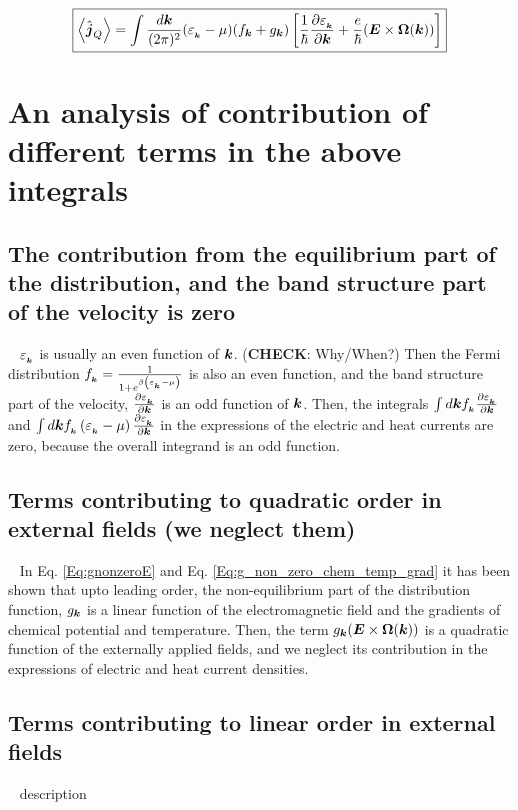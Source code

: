 \documentclass{report}
\renewcommand\vec[1]{\ensuremath\boldsymbol{#1}} %
\begin{document}
\begin{equation} \label{Eq:heat-current-simplified}
	\boxed{\expval{\hat{\vec{j}}_Q} = \int \frac{d\vec{k}}{(2\pi)^2} (\varepsilon_{_{\vec{k}}} - \mu) ({f}_{\vec{k}} + {g}_{\vec{k}}) \left[\frac{1}{\hbar} \frac{\partial \varepsilon_{_{\vec{k}}}}{\partial \vec{k}} + \frac{e}{\hbar} (\vec{E}\times\vec{\Omega}(\vec{k}))\right]}
\end{equation}
\section{An analysis of contribution of different terms in the above integrals}
\subsection{The contribution from the equilibrium part of the distribution, and the band structure part of the velocity is \textbf{zero}}~\label{sec:zeroCont}
$\varepsilon_{_{\vec{k}}}$ is usually an even function of $\vec{k}$. (\textbf{CHECK}: Why/When?) Then the Fermi distribution $f_{_{\vec{k}}} = \frac{1}{1+ e^{\beta\left(\varepsilon_{_{\vec{k}}} - \mu\right)}}$ is also an even function, and the band structure part of the velocity, $\frac{\partial \varepsilon_{_{\vec{k}}}}{\partial \vec{k}}$ is an odd function of $\vec{k}$. Then, the integrals $\int d\vec{k} f_{_{\vec{k}}} \frac{\partial \varepsilon_{_{\vec{k}}}}{\partial \vec{k}}$ and $\int d\vec{k} f_{_{\vec{k}}} \left(\varepsilon_{_{\vec{k}}} - \mu\right) \frac{\partial \varepsilon_{_{\vec{k}}}}{\partial \vec{k}}$ in the expressions of the electric and heat currents are zero, because the overall integrand is an odd function.
\subsection{Terms contributing to quadratic order  in external fields (we neglect them)}~\label{sec:quadCont}
In Eq. \eqref{Eq:gnonzeroE} and Eq. \eqref{Eq:g_non_zero_chem_temp_grad} it has been shown that upto leading order, the non-equilibrium part of the distribution function, ${g}_{\vec{k}}$ is a linear function of the electromagnetic field and the gradients of chemical potential and temperature. Then, the term ${g}_{\vec{k}} (\vec{E}\times\vec{\Omega}(\vec{k}))$ is a quadratic function of the externally applied fields, and we neglect its contribution in the expressions of electric and heat current densities.
\subsection{Terms contributing to linear order in external fields}~\label{sec:linearCont}
description
\end{document}
